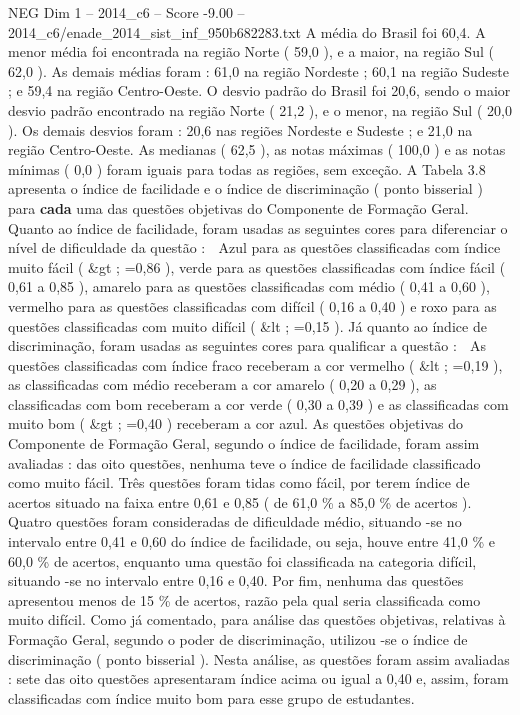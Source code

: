 \begin{textsample}{NEG Dim 1 – 2014\_c6 – Score -9.00 – 2014\_c6/enade\_2014\_sist\_inf\_950b682283.txt}
A média do Brasil foi 60,4.
A menor média foi encontrada na região Norte ( 59,0 ), e a maior, na região Sul ( 62,0 ).
As demais médias foram : 61,0 na região Nordeste ; 60,1 na região Sudeste ; e 59,4 na região Centro-Oeste.
O desvio padrão do Brasil foi 20,6, sendo o maior desvio padrão encontrado na região Norte ( 21,2 ), e o menor, na região Sul ( 20,0 ).
Os demais desvios foram : 20,6 nas regiões Nordeste e Sudeste ; e 21,0 na região Centro-Oeste.
As medianas ( 62,5 ), as notas máximas ( 100,0 ) e as notas mínimas ( 0,0 ) foram iguais para todas as regiões, sem exceção.
A Tabela 3.8 apresenta o índice de facilidade e o índice de discriminação ( ponto bisserial ) para \textbf{cada} uma das questões objetivas do Componente de Formação Geral.
Quanto ao índice de facilidade, foram usadas as seguintes cores para diferenciar o nível de dificuldade da questão :  Azul para as questões classificadas com índice muito fácil ( \&gt ; =0,86 ), verde para as questões classificadas com índice fácil ( 0,61 a 0,85 ), amarelo para as questões classificadas com médio ( 0,41 a 0,60 ), vermelho para as questões classificadas com difícil ( 0,16 a 0,40 ) e roxo para as questões classificadas com muito difícil ( \&lt ; =0,15 ).
Já quanto ao índice de discriminação, foram usadas as seguintes cores para qualificar a questão :  As questões classificadas com índice fraco receberam a cor vermelho ( \&lt ; =0,19 ), as classificadas com médio receberam a cor amarelo ( 0,20 a 0,29 ), as classificadas com bom receberam a cor verde ( 0,30 a 0,39 ) e as classificadas com muito bom ( \&gt ; =0,40 ) receberam a cor azul.
As questões objetivas do Componente de Formação Geral, segundo o índice de facilidade, foram assim avaliadas : das oito questões, nenhuma teve o índice de facilidade classificado como muito fácil.
Três questões foram tidas como fácil, por terem índice de acertos situado na faixa entre 0,61 e 0,85 ( de 61,0 \% a 85,0 \% de acertos ).
Quatro questões foram consideradas de dificuldade médio, situando -se no intervalo entre 0,41 e 0,60 do índice de facilidade, ou seja, houve entre 41,0 \% e 60,0 \% de acertos, enquanto uma questão foi classificada na categoria difícil, situando -se no intervalo entre 0,16 e 0,40.
Por fim, nenhuma das questões apresentou menos de 15 \% de acertos, razão pela qual seria classificada como muito difícil.
Como já comentado, para análise das questões objetivas, relativas à Formação Geral, segundo o poder de discriminação, utilizou -se o índice de discriminação ( ponto bisserial ).
Nesta análise, as questões foram assim avaliadas : sete das oito questões apresentaram índice acima ou igual a 0,40 e, assim, foram classificadas com índice muito bom para esse grupo de estudantes.

\end{textsample}

